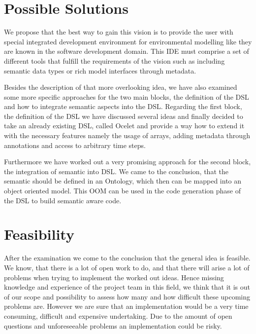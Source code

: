 \section*{Possible Solutions}
\par
We propose that the best way to gain this vision is to provide the user with special integrated development environment for environmental modelling like they are known in the software development domain. This IDE must comprise a set of different tools that fulfill the requirements of the vision such as including semantic data types or rich model interfaces through metadata.
\par
Besides the description of that more overlooking idea, we have also examined some more specific approaches for the two main blocks, the definition of the DSL and how to integrate semantic aspects into the DSL. Regarding the first block, the definition of the DSL we have discussed several ideas and finally decided to take an already existing DSL, called Ocelet and provide a way how to extend it with the necessary features namely the usage of arrays, adding metadata through annotations and access to arbitrary time steps.
\par
Furthermore we have worked out a very promising approach for the second block, the integration of semantic into DSL. We came to the conclusion, that the semantic should be defined in an Ontology, which then can be mapped into an object oriented model. This OOM can be used in the code generation phase of the DSL to build semantic aware code.

\section*{Feasibility}
\par
After the examination we come to the conclusion that the general idea is feasible. We know, that there is a lot of open work to do, and that there will arise a lot of problems when trying to implement the worked out ideas. Hence missing knowledge and experience of the project team in this field, we think that it is out of our scope and possibility to assess how many and how difficult these upcoming problems are. However we are sure that an implementation would be a very time consuming, difficult and expensive undertaking. Due to the amount of open questions and unforeseeable problems an implementation could be risky. 







